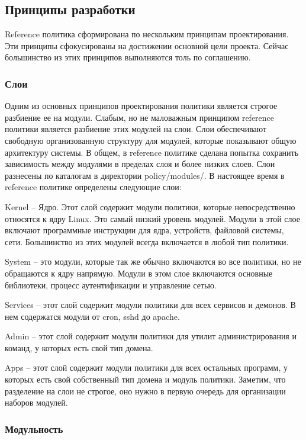 \documentclass{./../class/UIR}
\begin{document}
\subsection{Принципы разработки}
	Reference политика сформирована по нескольким принципам проектирования. Эти
	принципы сфокусированы на достижении основной цели проекта. Сейчас большинство
	из этих принципов выполняются толь по соглашению.
\subsubsection{Слои}
    Одним из основных принципов проектирования политики является строгое разбиение
	ее на модули. Слабым, но не маловажным принципом reference политики является
	разбиение этих модулей на слои. Слои обеспечивают свободную организованную
	структуру для модулей, которые показывают общую архитектуру системы.
	В общем,  в reference политике сделана попытка сохранить зависимость между
	модулями в пределах слоя и более низких слоев. Слои разнесены по каталогам в
	директории policy/modules/. В настоящее время в reference политике определены
	следующие слои:
	\begin{description}
	  \item Kernel – Ядро. Этот слой содержит модули политики, которые
	  непосредственно относятся к ядру Linux. Это самый низкий уровень модулей. Модули
	  в этой слое включают программные инструкции для ядра, устройств, файловой системы,
	  сети. Большинство из этих модулей всегда включается в любой тип политики.
	  \item System – это модули, которые так же обычно включаются во все политики, но
	  не обращаются к ядру напрямую. Модули в этом слое включаются основные
	  библиотеки, процесс аутентификации и управление сетью.
	  \item Services – этот слой содержит модули политики для всех сервисов и
	  демонов.
	  В нем содержатся модули от cron, sshd  до apache.
	  \item Admin – этот слой содержит модули политики для утилит администрирования и
	  команд, у которых есть свой тип домена.
	  \item Apps – этот слой содержит модули политики для всех остальных программ, у
	  которых есть свой собственный тип домена и модуль политики.
	  Заметим, что разделение на слои не строгое, оно нужно в первую очередь для
	  организации наборов модулей.
	\end{description}
	
\subsubsection{Модульность}
	
\end{document}
